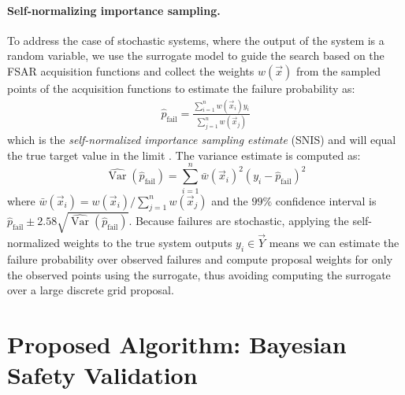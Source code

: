 \paragraph{Self-normalizing importance sampling.}
To address the case of stochastic systems, where the output of the system is a random variable, we use the surrogate model to guide the search based on the FSAR acquisition functions and collect the 
weights $w(\vec{x})$ from the sampled points of the acquisition functions to estimate the failure probability as:
\begin{align}
    \hat{p}_\text{fail} = \frac{\sum_{i=1}^n w(\vec{x}_i) y_i}{\sum_{j=1}^n w(\vec{x}_j)}
\end{align}
which is the \textit{self-normalized importance sampling estimate} (SNIS) and will equal the true target value in the limit \cite{owen2013monte}.
The variance estimate is computed as:
\begin{equation}
    \hat{\operatorname{Var}}(\hat{p}_\text{fail}) = \sum_{i=1}^n \bar{w}(\vec{x}_i)^2 (y_i - \hat{p}_\text{fail})^2    
\end{equation}
where $\bar{w}(\vec{x}_i) = w(\vec{x}_i) / \sum_{j=1}^n w(\vec{x}_j)$ and the $99\%$ confidence interval is $\hat{p}_\text{fail} \pm 2.58 \sqrt{\hat{\operatorname{Var}}(\hat{p}_\text{fail})}$.
Because failures are stochastic, applying the self-normalized weights to the true system outputs $y_i \in \vec{Y}$ means we can estimate the failure probability over observed failures and compute proposal weights for only the observed points using the surrogate, thus avoiding computing the surrogate over a large discrete grid proposal.


\section{Proposed Algorithm: Bayesian Safety Validation}

